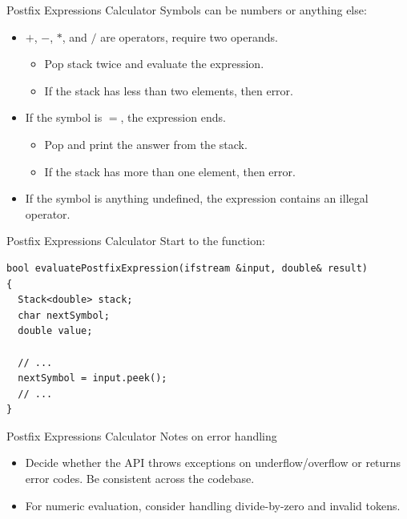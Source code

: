 \documentclass[14pt,aspectratio=1610]{beamer}
\begin{document}
\begin{frame}{Postfix Expressions Calculator}
Symbols can be numbers or anything else:
\begin{itemize}
  \item
    \(+\), \(-\), \(*\), and \(/\) are operators, require two operands.
  \begin{itemize}
    \item
      Pop stack twice and evaluate the expression.
    \item
      If the stack has less than two elements, then error.
  \end{itemize}
  \item
    If the symbol is \(=\), the expression ends.
    \begin{itemize}
      \item
        Pop and print the answer from the stack.
      \item
        If the stack has more than one element, then error.
    \end{itemize}
  \item
    If the symbol is anything undefined, the expression contains an illegal operator.
\end{itemize}
\end{frame}

\begin{frame}[fragile]{Postfix Expressions Calculator}
Start to the function:
\begin{lstlisting}
bool evaluatePostfixExpression(ifstream &input, double& result)
{
  Stack<double> stack;
  char nextSymbol;
  double value;

  // ...
  nextSymbol = input.peek();
  // ...
}
\end{lstlisting}
\end{frame}

\begin{frame}{Postfix Expressions Calculator}
Notes on error handling
\begin{itemize}
  \item
    Decide whether the API throws exceptions on underflow/overflow or returns
  error codes. Be consistent across the codebase.
  \item
    For numeric evaluation, consider handling divide-by-zero and invalid tokens.
\end{itemize}
\end{frame}
\end{document}
